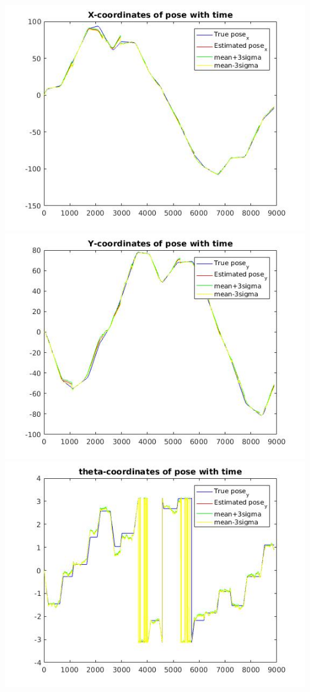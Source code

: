 \documentclass[a4paper,fleqn,11pt]{article}
\theoremstyle{mytheor}
\begin{document}
\begin{center}
\includegraphics[scale = 0.37]{../images/EKF-perfect-measurement-xvt.jpg}
\includegraphics[scale = 0.37]{../images/EKF-perfect-measurement-yvt.jpg}
\includegraphics[scale = 0.37]{../images/EKF-perfect-measurement-avt.jpg}

\end{center}
\end{document}
